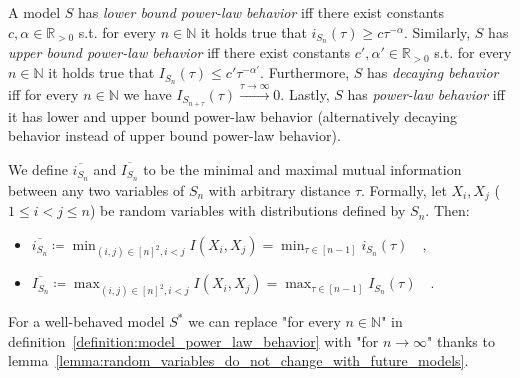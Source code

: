 \documentclass[../../main.tex]{subfiles}
\begin{document}
    \begin{definition}
        \label{definition:model_power_law_behavior}
        A model $S$ has \emph{lower bound power-law behavior} iff there exist constants $c, \alpha \in \mathbb{R}_{>0}$ s.t. for every $n \in \mathbb{N}$ it holds true that $i_{S_n}(\tau) \geq c \tau^{-\alpha}$. Similarly, $S$ has \emph{upper bound power-law behavior} iff there exist constants $c', \alpha' \in \mathbb{R}_{>0}$ s.t. for every $n \in \mathbb{N}$ it holds true that $I_{S_n}(\tau) \leq c' \tau^{-\alpha'}$. Furthermore, $S$ has \emph{decaying behavior} iff for every $n \in \mathbb{N}$ we have $I_{S_{n + \tau}}(\tau) \xrightarrow{\tau \to \infty} 0$. Lastly, $S$ has \emph{power-law behavior} iff it has lower and upper bound power-law behavior (alternatively decaying behavior instead of upper bound power-law behavior).
    \end{definition}

    \begin{definition}
        We define $\overline{i_{S_n}}$ and $\overline{I_{S_n}}$ to be the minimal and maximal mutual information between any two variables of $S_n$ with arbitrary distance $\tau$. Formally, let $X_i, X_j$ ($1 \leq i < j \leq n$) be random variables with distributions defined by $S_n$. Then:
        \vspace{-1em}
        \begin{itemize}
            \item $\overline{i_{S_n}} \coloneqq \min_{(i, j) \in [n]^2, i < j} I(X_i, X_j) = \min_{\tau \in [n - 1]} i_{S_n}(\tau) \quad ,$
            \item $\overline{I_{S_n}} \coloneqq \max_{(i, j) \in [n]^2, i < j} I(X_i, X_j) = \max_{\tau \in [n - 1]} I_{S_n}(\tau) \quad .$
        \end{itemize}
    \end{definition}

    \begin{corollary}
        For a well-behaved model $S^*$ we can replace "for every $n \in \mathbb{N}$" in definition~\ref{definition:model_power_law_behavior} with "for $n \to \infty$" thanks to lemma~\ref{lemma:random_variables_do_not_change_with_future_models}.
    \end{corollary}
\end{document}
